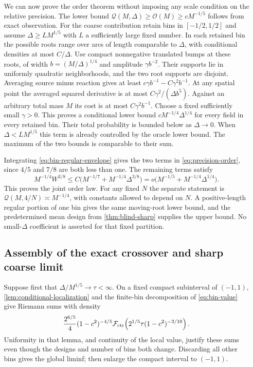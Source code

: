We can now prove the order theorem without imposing any scale
condition on the relative precision. The lower bound
$\mathcal Q(M,\Delta)\ge\mathcal O(M)\ge cM^{-1/5}$ follows
from exact observation. For the coarse contribution retain bins
in $[-1/2,1/2]$ and assume $\Delta\ge L M^{1/5}$ with $L$
a sufficiently large fixed number. In each retained bin the
possible roots range over arcs of length comparable to $\Delta$,
with conditional densities at most $C/\Delta$. Use compact
nonnegative translated bumps at these roots, of width
$b=(M/\Delta)^{1/4}$ and amplitude $\gamma b^{-2}$.
Their supports lie in uniformly quadratic neighborhoods, and
the two root supports are disjoint. Averaging source minus
reaction gives at least $c\gamma b^{-1}-C\gamma^2b^{-1}$.
At any spatial point the averaged squared derivative is at
most $C\gamma^2/(\Delta b^5)$. Against an arbitrary total
mass $M$ its cost is at most $C\gamma^2b^{-1}$. Choose a
fixed sufficiently small $\gamma>0$. This proves a conditional
lower bound $cM^{-1/4}\Delta^{1/4}$ for every field in every
retained bin. Their total probability is bounded below as
$\Delta\to0$. When $\Delta<L M^{1/5}$ this term is already
controlled by the oracle lower bound. The maximum of the two
bounds is comparable to their sum.

Integrating \eqref{eq:bin-regular-envelope} gives the two terms
in \eqref{eq:precision-order}, since $4/5$ and $7/8$ are both
less than one. The remaining terms satisfy
\begin{equation}\label{eq:fold-smallness}
 M^{-1/4}W^{3/8}
       \le C\bigl(M^{-1/7}+M^{-1/4}\Delta^{3/8}\bigr)
       =o\bigl(M^{-1/5}+M^{-1/4}\Delta^{1/4}\bigr).
\end{equation}
This proves the joint order law. For any fixed $N$ the separate
statement is $\mathcal Q(M,4/N)\asymp M^{-1/4}$, with constants
allowed to depend on $N$. A positive-length regular portion of
one bin gives the same moving-root lower bound, and the
predetermined mean design from \cref{thm:blind-sharp} supplies
the upper bound. No small-$\Delta$ coefficient is asserted for
that fixed partition.

\subsection{Assembly of the exact crossover and sharp coarse limit}
Suppose first that $\Delta/M^{1/5}\to\tau<\infty$. On a fixed
compact subinterval of $(-1,1)$, \cref{lem:conditional-localization}
and the finite-bin decomposition of \eqref{eq:bin-value} give
Riemann sums with density
\begin{equation}\label{eq:crossover-density}
 \frac{2^{6/5}}4(1-c^2)^{-4/5}
 \mathcal F_{\rm ctr}\!\left(2^{1/5}\tau(1-c^2)^{-3/10}\right).
\end{equation}
Uniformity in that lemma, and continuity of the local value,
justify these sums even though the designs and number of bins
both change. Discarding all other bins gives the global liminf;
then enlarge the compact interval to $(-1,1)$.


